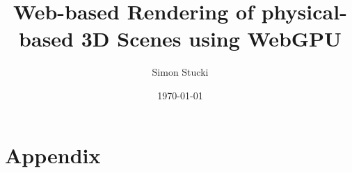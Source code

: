 \documentclass[a4paper, 11pt,abstract=on, listof=totocnumbered]{scrreprt}
\title{Web-based Rendering of physical-based 3D Scenes using WebGPU}
\author{Simon Stucki}
\date{\today}
\begin{document}
% 

\clearpage
\setcounter{page}{1}

%
%

%

%


%

%

%

%

%

%

\appendix
\chapter{Appendix}
\label{ch:appendix}
%
\end{document}
